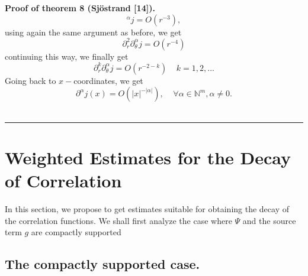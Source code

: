\documentclass{article}
\newenvironment{proof}[1][Proof]{\noindent\textbf{#1.} }{\ \rule{0.5em}{0.5em}}
\begin{document}
\begin{proof}[{Proof of theorem 8 (Sj\"{o}strand [14])}]
\begin{equation}
{}^{\alpha }j=O(r^{-3}),
\end{equation}%
using again the same argument as before, we get 
\begin{equation}
\partial _{r}^{2}\partial _{\theta }^{\alpha }j=O(r^{-4})
\end{equation}%
continuing this way, we finally get 
\begin{equation}
\partial _{r}^{k}\partial _{\theta }^{\alpha }j=O(r^{-2-k})\;\;\;\;k=1,2,...
\end{equation}%
Going back to $x-$coordinates, we get 
\begin{equation}
\partial ^{\alpha }j(x)=O(\left| x\right| ^{-\left| \alpha \right|
}),\;\;\;\;\forall \alpha \in \mathbb{N}^{m},\alpha \neq 0.
\end{equation}
\end{proof}

\section{Weighted Estimates for the Decay of Correlation}

In this section, we propose to get estimates suitable for obtaining the
decay of the correlation functions. We shall first analyze the case where $%
\Psi $ and the source term $g$ are compactly supported

\subsection{The compactly supported case.}
\end{document}
